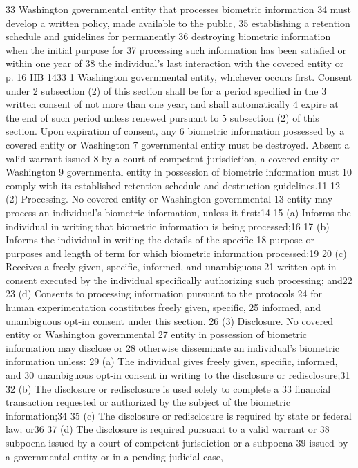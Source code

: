 33 Washington governmental entity that processes biometric information
34 must develop a written policy, made available to the public,
35 establishing a retention schedule and guidelines for permanently
36 destroying biometric information when the initial purpose for
37 processing such information has been satisfied or within one year of
38 the individual's last interaction with the covered entity or
p. 16 HB 1433
1 Washington governmental entity, whichever occurs first. Consent under
2 subsection (2) of this section shall be for a period specified in the
3 written consent of not more than one year, and shall automatically
4 expire at the end of such period unless renewed pursuant to
5 subsection (2) of this section. Upon expiration of consent, any
6 biometric information possessed by a covered entity or Washington
7 governmental entity must be destroyed. Absent a valid warrant issued
8 by a court of competent jurisdiction, a covered entity or Washington
9 governmental entity in possession of biometric information must
10 comply with its established retention schedule and destruction
guidelines.11
12 (2) Processing. No covered entity or Washington governmental
13 entity may process an individual's biometric information, unless it
first:14
15 (a) Informs the individual in writing that biometric information
is being processed;16
17 (b) Informs the individual in writing the details of the specific
18 purpose or purposes and length of term for which biometric
information processed;19
20 (c) Receives a freely given, specific, informed, and unambiguous
21 written opt-in consent executed by the individual specifically
authorizing such processing; and22
23 (d) Consents to processing information pursuant to the protocols
24 for human experimentation constitutes freely given, specific,
25 informed, and unambiguous opt-in consent under this section.
26 (3) Disclosure. No covered entity or Washington governmental
27 entity in possession of biometric information may disclose or
28 otherwise disseminate an individual's biometric information unless:
29 (a) The individual gives freely given, specific, informed, and
30 unambiguous opt-in consent in writing to the disclosure or
redisclosure;31
32 (b) The disclosure or redisclosure is used solely to complete a
33 financial transaction requested or authorized by the subject of the
biometric information;34
35 (c) The disclosure or redisclosure is required by state or
federal law; or36
37 (d) The disclosure is required pursuant to a valid warrant or
38 subpoena issued by a court of competent jurisdiction or a subpoena
39 issued by a governmental entity or in a pending judicial case,
